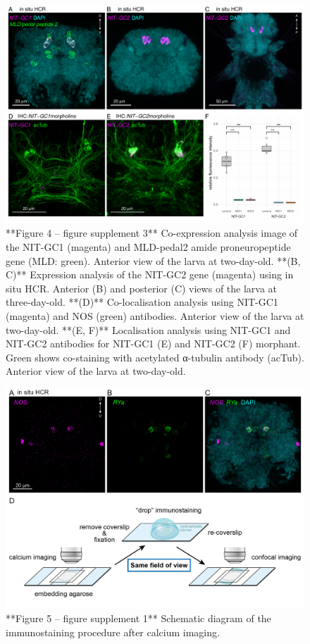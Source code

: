 \documentclass[
  10pt,
  onecolumn]{article}
\begin{document}
\begin{figure}
\includegraphics[width=33.33in]{figures/Fig4_sup3} \caption{**Figure 4 -- figure supplement 3** Co-expression analysis image of the NIT-GC1 (magenta) and MLD-pedal2 amide proneuropeptide gene (MLD: green). Anterior view of the larva at two-day-old. **(B, C)** Expression analysis of the NIT-GC2 gene (magenta) using in situ HCR. Anterior (B) and posterior (C) views of the larva at three-day-old. **(D)** Co-localisation analysis using NIT-GC1 (magenta) and NOS (green) antibodies. Anterior view of the larva at two-day-old. **(E, F)** Localisation analysis using NIT-GC1 and NIT-GC2 antibodies for NIT-GC1 (E) and NIT-GC2 (F) morphant. Green shows co-staining with acetylated α-tubulin antibody (acTub). Anterior view of the larva at two-day-old.}\label{fig:unnamed-chunk-14}
\end{figure}

\begin{figure}
\includegraphics[width=27.78in]{figures/Fig5_sup1} \caption{**Figure 5 -- figure supplement 1** Schematic diagram of the immunostaining procedure after calcium imaging.}\label{fig:unnamed-chunk-15}
\end{figure}
\end{document}
